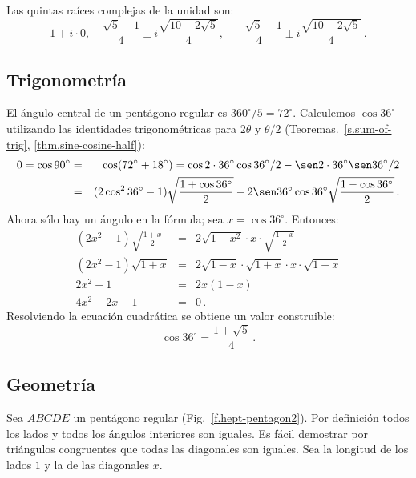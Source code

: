 \begin{advanced}
Las quintas raíces complejas de la unidad son:
\[
1+i\cdot 0,\quad\frac{\sqrt{5}-1}{4}\pm i \frac{\sqrt{10+2\sqrt{5}}}{4},\quad\frac{-\sqrt{5}-1}{4}\pm i \frac{\sqrt{10-2\sqrt{5}}}{4}\,.
\]
\vspace{-5ex}
\end{advanced}

\subsection{Trigonometría}
El ángulo central de un pentágono regular es $360^\circ/5=72^\circ$. Calculemos $\cos 36^\circ$ utilizando las identidades trigonométricas para $2\theta$ y $\theta/2$ (Teoremas.~\ref{s.sum-of-trig}, \ref{thm.sine-cosine-half}):
\begin{eqnarray*}
0=\cos 90^\circ &=& \cos(72^\circ+18^\circ)=\cos 2\cdot 36^\circ\cos 36^\circ/2 - \sen 2\cdot 36^\circ\sen 36^\circ/2\\
&=&(2\cos^2 36^\circ-1)\sqrt{\frac{1+\cos 36^\circ}{2}}-2\sen 36^\circ\cos 36^\circ\sqrt{\frac{1-\cos 36^\circ}{2}}\,.
\end{eqnarray*}
Ahora sólo hay un ángulo en la fórmula; sea $x=\cos 36^\circ$. Entonces:
\begin{eqnarray*}
(2x^2-1)\sqrt{\frac{1+x}{2}}&=&2\sqrt{1-x^2}\cdot x \cdot \sqrt{\frac{1-x}{2}}\\
(2x^2-1)\sqrt{1+x}&=&2\sqrt{1-x}\cdot\sqrt{1+x}\cdot x \cdot \sqrt{1-x}\\
2x^2-1&=&2x(1-x)\\
4x^2-2x-1&=&0\,.
\end{eqnarray*}
Resolviendo la ecuación cuadrática se obtiene un valor construible:
\[
\cos 36^\circ = \frac{1+\sqrt{5}}{4}\,.
\]

\subsection{Geometría}\label{s.geometry-pentagon}

Sea $\overline{ABCDE}$ un pentágono regular (Fig.~\ref{f.hept-pentagon2}). Por definición todos los lados y todos los ángulos interiores son iguales. Es fácil demostrar por triángulos congruentes que todas las diagonales son iguales. Sea la longitud de los lados $1$ y la de las diagonales $x$.

